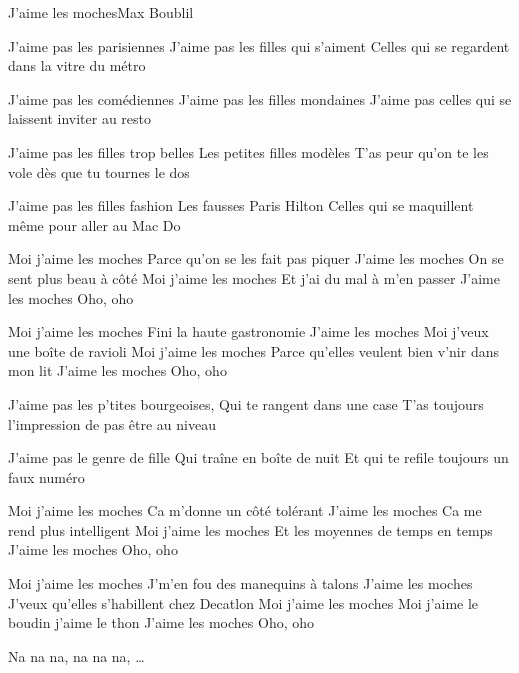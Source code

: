 \begin{Song}{J'aime les moches}{Max Boublil}

\begin{multicols}{2}
\begin{Verse}
J'aime pas les parisiennes
J'aime pas les filles qui s'aiment
Celles qui se regardent dans la vitre du métro
\espaceInterStrophe

J'aime pas les comédiennes
J'aime pas les filles mondaines
J'aime pas celles qui se laissent inviter au resto
\espaceInterStrophe

J'aime pas les filles trop belles
Les petites filles modèles
T'as peur qu'on te les vole dès que tu tournes le dos
\espaceInterStrophe

J'aime pas les filles fashion
Les fausses Paris Hilton
Celles qui se maquillent même pour aller au Mac Do
\end{Verse}
\espaceInterStrophe

\begin{Chorus}
Moi j'aime les moches
Parce qu'on se les fait pas piquer
J'aime les moches
On se sent plus beau à côté
Moi j'aime les moches
Et j'ai du mal à m'en passer
J'aime les moches
Oho, oho
\espaceInterStrophe

Moi j'aime les moches
Fini la haute gastronomie
J'aime les moches
Moi j'veux une boîte de ravioli
Moi j'aime les moches
Parce qu'elles veulent bien v'nir dans mon lit
J'aime les moches
Oho, oho
\end{Chorus}
\espaceInterStrophe

\begin{Verse}
J'aime pas les p'tites bourgeoises,
Qui te rangent dans une case
T'as toujours l'impression de pas être au niveau
\espaceInterStrophe

J'aime pas le genre de fille
Qui traîne en boîte de nuit
Et qui te refile toujours un faux numéro
\end{Verse}
\columnbreak

\begin{Chorus}
Moi j'aime les moches
Ca m'donne un côté tolérant
J'aime les moches
Ca me rend plus intelligent
Moi j'aime les moches
Et les moyennes de temps en temps
J'aime les moches
Oho, oho
\espaceInterStrophe

Moi j'aime les moches
J'm'en fou des manequins à talons
J'aime les moches
J'veux qu'elles s'habillent chez Decatlon
Moi j'aime les moches
Moi j'aime le boudin j'aime le thon
J'aime les moches
Oho, oho
\espaceInterStrophe

Na na na, na na na, \dots
\espaceInterStrophe


\end{Chorus}
\end{multicols}
\end{Song}
